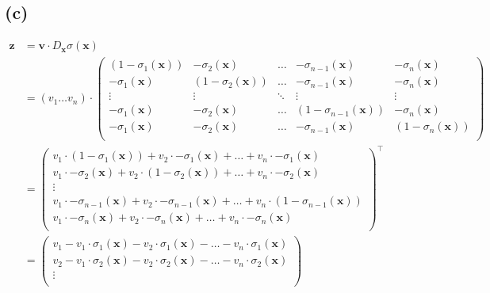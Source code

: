 \subsection*{(c)}
\begin{align*}
\boldsymbol{z} &= \boldsymbol{v} \cdot D_{\boldsymbol{x}}\sigma(\boldsymbol{x}) \\
&=
(v_1 \dots v_n)
\cdot
\begin{pmatrix}
(1 - \sigma_1(\boldsymbol{x})) & -\sigma_2(\boldsymbol{x}) & \dots & -\sigma_{n-1}(\boldsymbol{x}) & -\sigma_n(\boldsymbol{x}) \\
-\sigma_1(\boldsymbol{x}) & (1 - \sigma_2(\boldsymbol{x})) & \dots & -\sigma_{n-1}(\boldsymbol{x}) & -\sigma_n(\boldsymbol{x}) \\
\vdots & \vdots & \ddots & \vdots & \vdots \\
-\sigma_1(\boldsymbol{x}) & -\sigma_2(\boldsymbol{x}) & \dots & (1 - \sigma_{n-1}(\boldsymbol{x})) & -\sigma_n(\boldsymbol{x}) \\
-\sigma_1(\boldsymbol{x}) & -\sigma_2(\boldsymbol{x}) & \dots & -\sigma_{n-1}(\boldsymbol{x}) & (1 - \sigma_n(\boldsymbol{x})) \\
\end{pmatrix} \\
&=
\begin{pmatrix}
v_1 \cdot (1 - \sigma_1(\boldsymbol{x})) + v_2 \cdot -\sigma_1(\boldsymbol{x}) + \dots + v_n \cdot -\sigma_1(\boldsymbol{x}) \\
v_1 \cdot -\sigma_2(\boldsymbol{x}) + v_2 \cdot (1 - \sigma_2(\boldsymbol{x})) + \dots + v_n \cdot -\sigma_2(\boldsymbol{x}) \\
\vdots \\
v_1 \cdot -\sigma_{n-1}(\boldsymbol{x}) + v_2 \cdot -\sigma_{n-1}(\boldsymbol{x}) + \dots + v_n \cdot (1 - \sigma_{n-1}(\boldsymbol{x})) \\
v_1 \cdot -\sigma_n(\boldsymbol{x}) + v_2 \cdot -\sigma_n(\boldsymbol{x}) + \dots + v_n \cdot -\sigma_n(\boldsymbol{x}) \\
\end{pmatrix}^\top \\
&=
\begin{pmatrix}
v_1 - v_1 \cdot \sigma_1(\boldsymbol{x}) - v_2 \cdot \sigma_1(\boldsymbol{x}) - \dots - v_n \cdot \sigma_1(\boldsymbol{x}) \\
v_2 - v_1 \cdot \sigma_2(\boldsymbol{x}) - v_2 \cdot \sigma_2(\boldsymbol{x}) - \dots - v_n \cdot \sigma_2(\boldsymbol{x}) \\
\vdots \\

\end{pmatrix}
\end{align*}
